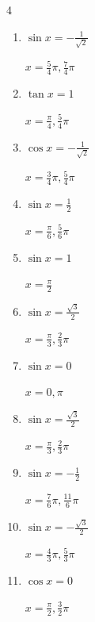 \begin{multicols}{4}
\begin{enumerate}
        $\displaystyle x = \frac{\pi}{6} , \frac{11}{6}\pi$

  \item $\displaystyle \sin{x}  = -\frac{1}{\sqrt{2}}$

        $\displaystyle x = \frac{5}{4}\pi , \frac{7}{4}\pi$

  \item $\displaystyle \tan{x}  = 1$

        $\displaystyle x = \frac{\pi}{4} , \frac{5}{4}\pi$

  \item $\displaystyle \cos{x}  = -\frac{1}{\sqrt{2}}$

        $\displaystyle x = \frac{3}{4}\pi , \frac{5}{4}\pi$

  \item $\displaystyle \sin{x}  = \frac{1}{2}$

        $\displaystyle x = \frac{\pi}{6} , \frac{5}{6}\pi$

  \item $\displaystyle \sin{x}  = 1$

        $\displaystyle x = \frac{\pi}{2}$

  \item $\displaystyle \sin{x}  = \frac{\sqrt{3}}{2}$

        $\displaystyle x = \frac{\pi}{3} , \frac{2}{3}\pi$

  \item $\displaystyle \sin{x}  = 0$

        $\displaystyle x = 0 , \pi$

  \item $\displaystyle \sin{x}  = \frac{\sqrt{3}}{2}$

        $\displaystyle x = \frac{\pi}{3} , \frac{2}{3}\pi$

  \item $\displaystyle \sin{x}  = -\frac{1}{2}$

        $\displaystyle x = \frac{7}{6}\pi , \frac{11}{6}\pi$

  \item $\displaystyle \sin{x}  = -\frac{\sqrt{3}}{2}$

        $\displaystyle x = \frac{4}{3}\pi , \frac{5}{3}\pi$

\columnbreak %

  \item $\displaystyle \cos{x}  = 0$

        $\displaystyle x = \frac{\pi}{2} , \frac{3}{2}\pi$


\end{enumerate}
\end{multicols}
